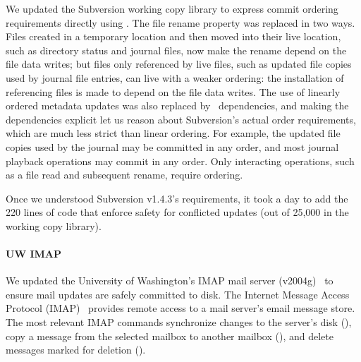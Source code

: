 We updated the Subversion working copy library to
express commit ordering requirements directly using \patchgroups.
%
The file rename property was replaced in two ways.
%
Files created in a temporary location and then moved into their
live location, such as directory status and journal files, now
make the rename depend on the file data writes; but
%
files only referenced by live files, such as updated file
copies used by journal file entries, can live with a weaker ordering:
the installation of referencing files is made to depend on the
file data writes.
%
The use of linearly ordered metadata updates was also replaced by
\patchgroup\ dependencies, and
%
making the dependencies explicit let us reason about Subversion's actual
order requirements, which are much less strict than linear ordering.
%
%
For example, the updated file copies used by the journal may be
committed in any order, and most journal playback operations
may commit in any order.
%
Only interacting operations, such as a
file read and subsequent rename, require ordering.

Once we understood Subversion v1.4.3's requirements, it took a day to add
the 220 lines of code that enforce safety for conflicted updates (out of
25,000 in the working copy library).

\paragraph{UW IMAP}
\label{sec:patchgroup:uwimap}

We updated the University of Washington's IMAP mail server
(v2004g)~\cite{uwimap} to ensure mail updates are safely committed to disk.
%
The Internet Message Access Protocol (IMAP)~\cite{rfc3501} provides
remote access to a mail server's email message store.
%
The most relevant IMAP commands synchronize changes to the server's
disk (\imapCheck), copy a message from the selected mailbox to another
mailbox (\imapCopy), and delete messages marked for deletion (\imapExpunge).

